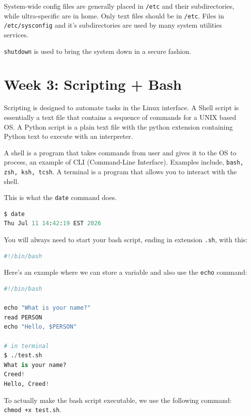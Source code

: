 \documentclass[11pt]{article}
\begin{document}
\noindent System-wide config files are generally placed in \texttt{/etc} and their subdirectories, while ultra-specific are in home. Only text files should be in \texttt{/etc}. Files in \texttt{/etc/sysconfig} and it's subdirectories are used by many system utilities services. 

\noindent \texttt{shutdown} is used to bring the system down in a secure fashion.




\section*{Week 3: Scripting + Bash}
Scripting is designed to automate tasks in the Linux interface. A Shell script is essentially a text file that contains a sequence of commands for a UNIX based OS. A Python script is a plain text file with the python extension containing Python text to execute with an interpreter. 

\noindent A shell is a program that takes commands from user and gives it to the OS to process, an example of CLI (Command-Line Interface). Examples include, \texttt{bash, zsh, ksh, tcsh}. A terminal is a program that allows you to interact with the shell.

\noindent This is what the \texttt{date} command does.
\begin{lstlisting}[language=python]
$ date
Thu Jul 11 14:42:19 EST 2026
\end{lstlisting}

You will always need to start your bash script, ending in extension \texttt{.sh}, with this:
\begin{lstlisting}[language=python]
#!/bin/bash 
\end{lstlisting}

Here's an example where we can store a variable and also use the \texttt{echo} command:
\begin{lstlisting}[language=python]
#!/bin/bash

echo "What is your name?"
read PERSON
echo "Hello, $PERSON"

# in terminal
$ ./test.sh
What is your name?
Creed!
Hello, Creed!
\end{lstlisting}

\noindent To actually make the bash script executable, we use the following command: \texttt{chmod +x test.sh}.
\end{document}
